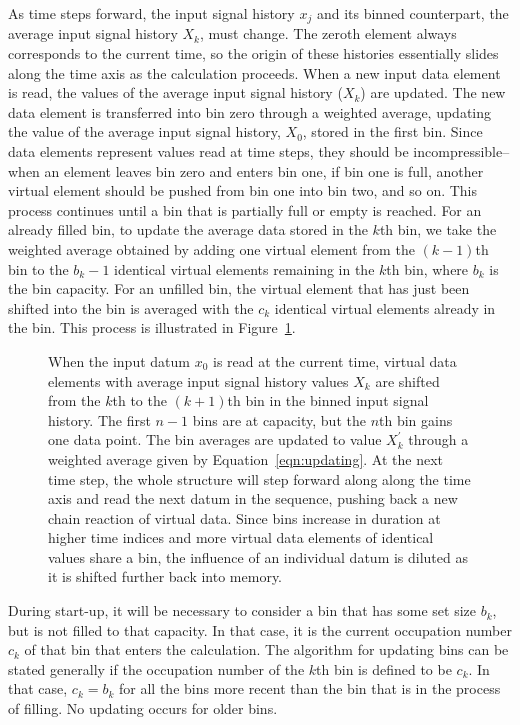 As time steps forward, the input signal history $x_j$ and its binned counterpart, the average input signal history $X_k$, must change. The zeroth element always corresponds to the current time, so the origin of these histories essentially slides along the time axis as the calculation proceeds. When a new input data element is read, the values of the average input signal history ($X_k$) are updated. The new data element is transferred into bin zero through a weighted average, updating the value of the average input signal history, $X_0$, stored in the first bin. Since data elements represent values read at time steps, they should be incompressible-- when an element leaves bin zero and enters bin one, if bin one is full, another virtual element should be pushed from bin one into bin two, and so on. This process continues until a bin that is partially full or empty is reached. For an already filled bin, to update the average data stored in the $k$th bin, we take the weighted average obtained by adding one virtual element from the $(k-1)$th bin to the $b_k-1$ identical virtual elements remaining in the $k$th bin, where $b_k$ is the bin capacity. For an unfilled bin, the virtual element that has just been shifted into the bin is averaged with the $c_k$ identical virtual elements already in the bin. This process is illustrated in Figure~\ref{fig:binShifting}.

\begin{figure}
\caption{When the input datum $x_0$ is read at the current time, virtual data elements with average input signal history values $X_k$ are shifted from the $k$th to the $(k+1)$th bin in the binned input signal history. The first $n-1$ bins are at capacity, but the $n$th bin gains one data point. The bin averages are updated to value $X_k^\prime$ through a weighted average given by Equation~\ref{eqn:updating}. At the next time step, the whole structure will step forward along along the time axis and read the next datum in the sequence, pushing back a new chain reaction of virtual data. Since bins increase in duration at higher time indices and more virtual data elements of identical values share a bin, the influence of an individual datum is diluted as it is shifted further back into memory.}
\label{fig:binShifting}
\end{figure}

During start-up, it will be necessary to consider a bin that has some
set size $b_k$, but is not filled to that capacity. In that case, it
is the current occupation number $c_k$ of that bin that enters the
calculation. The algorithm for updating bins can be stated generally if the occupation number of the $k$th bin is defined to be $c_k$. In that case, $c_k=b_k$ for all the bins more recent than the bin that is in the process of filling. No updating occurs for older bins. 

